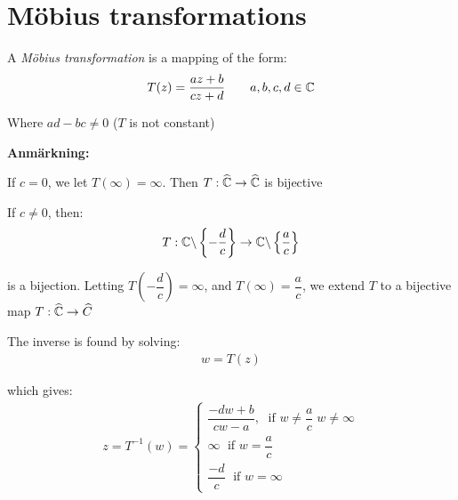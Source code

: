 \section{Möbius transformations}
\par\bigskip
\begin{theo}{}
  A \textit{Möbius transformation} is a mapping of the form:
  \begin{equation*}
    \begin{gathered}
      T(z) = \dfrac{az+b}{cz+d}\qquad a,b,c,d\in\mathbb{C}
    \end{gathered}
  \end{equation*}
  \par\bigskip
  \noindent Where $ad-bc\neq0$ ($T$ is not constant)
\end{theo}
\par\bigskip
\noindent\textbf{Anmärkning:}\par
\noindent If $c=0$, we let $T(\infty) = \infty$. Then $T:\widehat{\mathbb{C}}\to\widehat{\mathbb{C}}$ is bijective
\par\bigskip
\noindent If $c\neq0$, then:
\begin{equation*}
  \begin{gathered}
    T:\mathbb{C}\backslash\left\{-\dfrac{d}{c}\right\}\to\mathbb{C}\backslash\left\{\dfrac{a}{c}\right\}
  \end{gathered}
\end{equation*}\par
\noindent is a bijection. Letting $T\left(-\dfrac{d}{c}\right)=\infty$, and $T(\infty) = \dfrac{a}{c}$, we extend $T$  to a bijective map $T:\widehat{\mathbb{C}}\to\widehat{C}$
\par\bigskip
\noindent The inverse is found by solving:
\begin{equation*}
  \begin{gathered}
    w = T(z)
  \end{gathered}
\end{equation*}\par
\noindent which gives:
\begin{equation*}
  \begin{gathered}
    z = T^{-1}(w)=
    \begin{cases}
    \dfrac{-dw+b}{cw-a},\;\text{ if } w\neq\dfrac{a}{c}\; w\neq\infty\\
    \infty\;\text{ if } w=\dfrac{a}{c}\\
    \dfrac{-d}{c}\;\text{ if } w =\infty
  \end{cases}
  \end{gathered}
\end{equation*}
